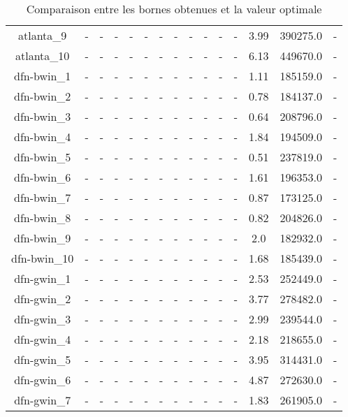 \documentclass[main.tex]{subfiles}
\begin{document}
\begin{landscape}
\begin{table}[h]
\begin{tabular}{c|cc|ccc|ccc|ccc|ccc}
	atlanta\_9 &- &- &- &- &- &- &- &- &- &- &- &3.99 &390275.0 &-\\
	atlanta\_10 &- &- &- &- &- &- &- &- &- &- &- &6.13 &449670.0 &-\\
	dfn-bwin\_1 &- &- &- &- &- &- &- &- &- &- &- &1.11 &185159.0 &-\\
	dfn-bwin\_2 &- &- &- &- &- &- &- &- &- &- &- &0.78 &184137.0 &-\\
	dfn-bwin\_3 &- &- &- &- &- &- &- &- &- &- &- &0.64 &208796.0 &-\\
	dfn-bwin\_4 &- &- &- &- &- &- &- &- &- &- &- &1.84 &194509.0 &-\\
	dfn-bwin\_5 &- &- &- &- &- &- &- &- &- &- &- &0.51 &237819.0 &-\\
	dfn-bwin\_6 &- &- &- &- &- &- &- &- &- &- &- &1.61 &196353.0 &-\\
	dfn-bwin\_7 &- &- &- &- &- &- &- &- &- &- &- &0.87 &173125.0 &-\\
	dfn-bwin\_8 &- &- &- &- &- &- &- &- &- &- &- &0.82 &204826.0 &-\\
	dfn-bwin\_9 &- &- &- &- &- &- &- &- &- &- &- &2.0 &182932.0 &-\\
	dfn-bwin\_10 &- &- &- &- &- &- &- &- &- &- &- &1.68 &185439.0 &-\\
	dfn-gwin\_1 &- &- &- &- &- &- &- &- &- &- &- &2.53 &252449.0 &-\\
	dfn-gwin\_2 &- &- &- &- &- &- &- &- &- &- &- &3.77 &278482.0 &-\\
	dfn-gwin\_3 &- &- &- &- &- &- &- &- &- &- &- &2.99 &239544.0 &-\\
	dfn-gwin\_4 &- &- &- &- &- &- &- &- &- &- &- &2.18 &218655.0 &-\\
	dfn-gwin\_5 &- &- &- &- &- &- &- &- &- &- &- &3.95 &314431.0 &-\\
	dfn-gwin\_6 &- &- &- &- &- &- &- &- &- &- &- &4.87 &272630.0 &-\\
	dfn-gwin\_7 &- &- &- &- &- &- &- &- &- &- &- &1.83 &261905.0 &-\\
\end{tabular}\caption{Comparaison entre les bornes obtenues et la valeur optimale}
\end{table}
\end{landscape}
\newpage
\thispagestyle{empty}
\end{document}
